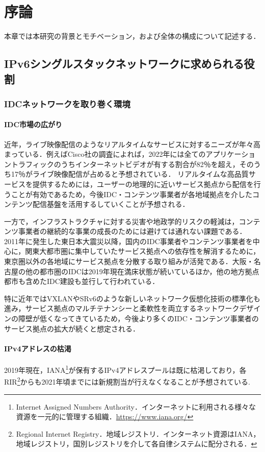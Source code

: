 \chapter{序論}
\label{introduction}
本章では本研究の背景とモチベーション，および全体の構成について記述する．

\section{IPv6シングルスタックネットワークに求められる役割}
\label{introduction:background}

\subsection{IDCネットワークを取り巻く環境}
\subsubsection{IDC市場の広がり}


近年，ライブ映像配信のようなリアルタイムなサービスに対するニーズが年々高まっている．例えばCisco社の調査\cite{index2017global}によれば，2022年には全てのアプリケーショントラフィックのうちインターネットビデオが有する割合が82％を超え，そのうち17％がライブ映像配信が占めると予想されている．
リアルタイムな高品質サービスを提供するためには，ユーザーの地理的に近いサービス拠点から配信を行うことが有効であるため，今後IDC・コンテンツ事業者が各地域拠点を介したコンテンツ配信基盤を活用するしていくことが予想される．

一方で，インフラストラクチャに対する災害や地政学的リスクの軽減は，コンテンツ事業者の継続的な事業の成長のためには避けては通れない課題である\cite{alonso2001business}．
2011年に発生した東日本大震災以降，国内のIDC事業者やコンテンツ事業者を中心に，関東大都市圏に集中していたサービス拠点への依存性を解消するために，東京圏以外の各地域にサービス拠点を分散する取り組みが活発である\cite{JANOG44_robust}．大阪・名古屋の他の都市圏のIDCは2019年現在満床状態が続いているほか，他の地方拠点都市も含めたIDC建設も並行して行われている．　

特に近年ではVXLANやSRv6のような新しいネットワーク仮想化技術の標準化も進み，サービス拠点のマルチテナンシーと柔軟性を両立するネットワークデザインの障壁が低くなってきているため，今後より多くのIDC・コンテンツ事業者のサービス拠点の拡大が続くと想定される．


\subsubsection{IPv4アドレスの枯渇}
\label{introduction:background:ipv4_problems}
2019年現在，IANA\footnote{Internet Assigned Numbers Authority．インターネットに利用される様々な資源を一元的に管理する組織．\url{https://www.iana.org/}}が保有するIPv4アドレスプールは既に枯渇しており\cite{IANA_allocation}，各RIR\footnote{Regional Internet Registry．地域レジストリ．インターネット資源はIANA，地域レジストリ，国別レジストリを介して各自律システムに配分される．}からも2021年頃までには新規割当が行えなくなることが予想されている\cite{potaroo_IPv4}.

